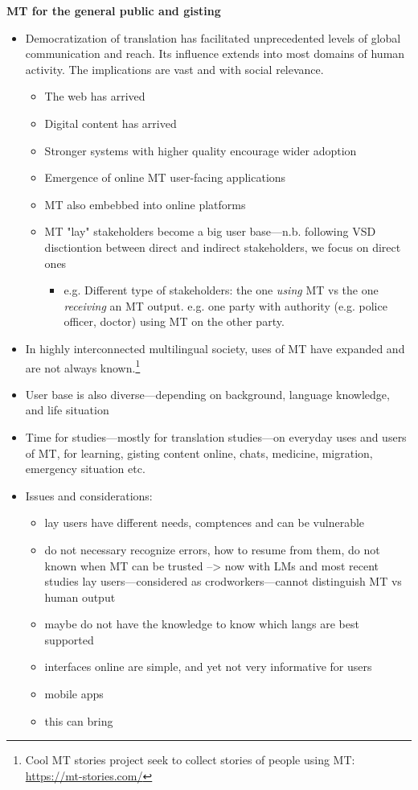     \item \textbf{MT for the general public and gisting}

\begin{itemize}

\item Democratization of translation has facilitated unprecedented levels of global communication and reach. Its influence extends into most domains of human activity. The implications are vast and with social relevance. 
\begin{itemize}
    \item The web has arrived
    \item Digital content has arrived
    \item Stronger systems with  higher quality encourage wider adoption
    \item Emergence of online MT user-facing applications 
    \item MT also embebbed into online platforms
    \item MT "lay" stakeholders become a big user base---n.b. following VSD disctiontion between direct and indirect stakeholders, we focus on direct ones
    \begin{itemize}
        \item e.g. Different type of stakeholders: the one \textit{using} MT vs the one \textit{receiving} an MT output. e.g. one party with authority (e.g. police officer, doctor) using MT on the other party.
    \end{itemize}
\end{itemize}

\item In highly interconnected multilingual society, uses of MT have expanded and are not always known.\footnote{Cool MT stories project seek to collect stories of people using MT: \url{https://mt-stories.com/}}
\item User base is also diverse---depending on background, language knowledge, and life situation

\item Time for studies---mostly for translation studies---on everyday uses and users of MT, for learning, gisting content online, chats, medicine, migration, emergency situation etc. 
\item Issues and considerations:
\begin{itemize}
    \item lay users have different needs, comptences and can be vulnerable
    \item do not necessary recognize errors, how to resume from them, do not known when MT can be trusted --> now with LMs and most recent studies lay users---considered as crodworkers---cannot distinguish MT vs human output
    \item maybe do not have the knowledge to know which langs are best supported
    \item interfaces online are simple, and yet not very informative for users
    \item mobile apps
    \item this can bring \end{itemize}

\end{itemize}


